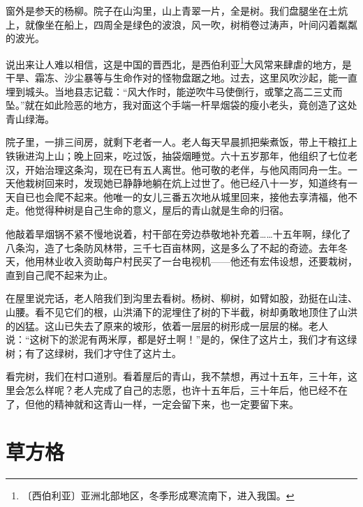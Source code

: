 \documentclass[12pt,UTF-8,openany]{ctexbook}
\begin{document}
\begin{large}
    
    窗外是参天的杨柳。院子在山沟里，山上青翠一片，全是树。我们盘腿坐在土炕上，就像坐在船上，四周全是绿色的波浪，风一吹，树梢卷过涛声，叶间闪着粼粼的波光。
    
    说出来让人难以相信，这是中国的晋西北，是西伯利亚\footnote{〔西伯利亚〕亚洲北部地区，冬季形成寒流南下，进入我国。}大风常来肆虐的地方，是干旱、霜冻、沙尘暴等与生命作对的怪物盘踞之地。过去，这里风吹沙起，能一直埋到城头。当地县志记载：“风大作时，能逆吹牛马使倒行，或擎之高二三丈而坠。”就在如此险恶的地方，我对面这个手端一杆旱烟袋的瘦小老头，竟创造了这处青山绿海。
    
    院子里，一排三间房，就剩下老者一人。老人每天早晨抓把柴煮饭，带上干粮扛上铁锹进沟上山；晚上回来，吃过饭，抽袋烟睡觉。六十五岁那年，他组织了七位老汉，开始治理这条沟，现在已有五人离世。他可敬的老伴，与他风雨同舟一生。一天他栽树回来时，发现她已静静地躺在炕上过世了。他已经八十一岁，知道终有一天自已也会爬不起来。他唯一的女儿三番五次地从城里回来，接他去享清福，他不走。他觉得种树是自己生命的意义，屋后的青山就是生命的归宿。
    
    他敲着旱烟锅不紧不慢地说着，村干部在旁边恭敬地补充着……十五年啊，绿化了八条沟，造了七条防风林带，三千七百亩林网，这是多么了不起的奇迹。去年冬天，他用林业收入资助每户村民买了一台电视机——他还有宏伟设想，还要栽树，直到自己爬不起来为止。
    
    在屋里说完话，老人陪我们到沟里去看树。杨树、柳树，如臂如股，劲挺在山洼、山腰。看不见它们的根，山洪涌下的泥埋住了树的下半截，树却勇敢地顶住了山洪的凶猛。这山已失去了原来的坡形，依着一层层的树形成一层层的梯。老人说：“这树下的淤泥有两米厚，都是好土啊！”是的，保住了这片土，我们才有这绿树；有了这绿树，我们才守住了这片土。
    
    看完树，我们在村口道别。看着屋后的青山，我不禁想，再过十五年，三十年，这里会怎么样呢？老人完成了自己的志愿，也许十五年后，三十年后，他已经不在了，但他的精神就和这青山一样，一定会留下来，也一定要留下来。
    
\end{large}



\chapter{草方格}
\end{document}
